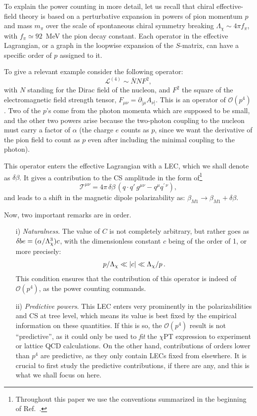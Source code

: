 \documentclass[12pt,preprint,tightenlines,
showpacs,preprintnumbers,amsmath,amssymb,
a4paper,nofootinbib]{revtex4-1}
\def\beq{\begin{equation}}
\def\eeq{\end{equation}}
\def\al{\alpha}
\def\be{\beta}
\def\de{\delta} \def\De{\Delta}
\def\pa{\partial}
\def\pa{\partial}
\def\lag{{\mathcal L}}
\begin{document}
To explain the power counting in more detail,  
let us recall that  chiral effective-field theory is based on 
a perturbative expansion in powers of pion momentum $p$ and mass $m_\pi$ over the scale of spontaneous chiral symmetry breaking ${\Lambda_\chi\sim 4\pi f_\pi}$, with
$f_\pi\simeq 92$~MeV the pion decay constant. Each operator in the effective Lagrangian, or a
graph in the loopwise expansion of the $S$-matrix, can have a specific order of
$p$ assigned to it.

To give a relevant example consider the following operator: 
\beq
\lag^{(4)} \sim \bar N N F^2,
\eeq
with $N$ standing for the Dirac field
of the nucleon, and $F^2$ the square of the electromagnetic field strength tensor, $F_{\mu\nu}=\pa_{[\mu}A_{\nu]}$. This is an operator of $\mathcal{O}(p^4)$. Two of the $p$'s come from the
photon momenta which are supposed to be small, and the other two powers arise because the two-photon
coupling to the nucleon must carry a factor of $\al$ (the charge $e$ counts as $p$, since we want
the derivative of the pion field to count as $p$ even after including the minimal coupling to the photon).

This operator enters the effective Lagrangian with a LEC, which we shall denote as $\de \be$.
It gives a contribution to the CS amplitude in the form of\footnote{
Throughout this paper we use the conventions summarized in the beginning of Ref.~\cite{Hagelstein:2015egb}.}
\beq 
\mathcal{T}^{\mu\nu}_{} = 4\pi \, \de \be \, (q\cdot q' \, g^{\mu\nu} - q^\mu q^{\prime\,\nu}),
\eeq 
and leads to a shift in the magnetic dipole polarizability as: $\be_{M1}\to \be_{M1}+\de\be $.

Now, two important remarks are in order.
\begin{itemize}
\item[i)] {\em Naturalness}. The value of $C$ is not completely arbitrary, but rather goes as 
${\de be = (\al/\La_\chi^3) c} $, with the dimensionless constant $c$ being of the order of 1, or more precisely:
\beq 
p/\La_\chi \ll |c|\ll \La_\chi/p\,.
\eeq 
This condition ensures that the contribution  of this operator is indeed 
of $\mathcal{O}(p^4)$, as the power counting commands.
\item[ii)] {\em Predictive powers}.
This LEC enters very prominently in the polarizabilities and CS  at tree level,
which means its value is best fixed by the empirical information on these quantities. 
If this is so, the $\mathcal{O}(p^4)$ result is not ``predictive'', as it could only be used to {\em fit} 
the $\chi$PT expression to experiment or lattice QCD calculations. On the other hand, contributions
of orders lower than $p^4$ are predictive, as they only contain LECs fixed from elsewhere.
It is crucial to first study the predictive contributions, if there are any, and this is what we shall
focus on here.
\end{itemize}
\end{document}
